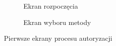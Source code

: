 \begin{figure}[ht]
\begin{subfigure}[t]{0.33\textwidth}
    \caption{Ekran rozpoczęcia}
  \end{subfigure}
  \begin{subfigure}[t]{0.33\textwidth}
    \centering
    \caption{Ekran wyboru metody}
  \end{subfigure}
  \caption{Pierwsze ekrany procesu autoryzacji}
  \label{fig:login}
\end{figure}


